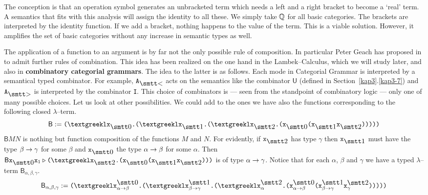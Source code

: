 The conception is that an operation symbol generates an
unbracketed term which needs a left and a right bracket
to become a `real' term. A semantics that fits with this
analysis will assign the identity to all these. We simply
take $\mathbb{Q}$ for all basic categories. The brackets are interpreted
by the identity function. If we add a bracket, nothing happens
to the value of the term. This is a viable solution. However,
it amplifies the set of basic categories without any increase in
semantic types as well.

The application of a function to an argument is by far not the
only possible rule of composition. In particular Peter Geach has
proposed in \cite{geach:program} to admit further rules of
combination. This idea has been realized on the one hand in
the Lambek--Calculus, which we will study later, and also in
\textbf{combinatory categorial grammars}.
The idea to the latter is as follows. Each mode in Categorial
Grammar is interpreted by a semantical typed combinator.
For example, $\mbox{\tt A}_{\skl}$ acts on the semantics like the
combinator $\mathsf{U}$ (defined in Section~\ref{kap3}.\ref{kap3-7}) and
$\mbox{\tt A}_{\sgr}$ is interpreted by the combinator {\tt I}.
This choice of combinators is --- seen from the standpoint of
combinatory logic --- only one of many possible choices. Let
us look at other possibilities. We could add to the ones we
have also the functions corresponding to the following closed 
$\lambda$--term.
\begin{equation}
\mathsf{B} := \mbox{\tt (\stlambda x}_{\snull}\mbox{\tt .(%
\stlambda x}_{\seins}\mbox{\tt .(\stlambda x}_{\szwei}\mbox{\tt %
.(x}_{\snull}\mbox{\tt (x}_{\seins}\mbox{\tt x}_{\szwei}\mbox{\tt )))))} 
\end{equation}
$\mathsf{B}MN$ is nothing but function composition of the functions
$M$ and $N$. For evidently, if $\mbox{\tt x}_{\szwei}$ has type $\gamma$
then $\mbox{\tt x}_{\seins}$ must have the type $\beta \rightarrow \gamma$ for 
some $\beta$ and $\mbox{\tt x}_{\snull}$ the type $\alpha \rightarrow \beta$ for 
some $\alpha$. Then $\mathsf{B}\mbox{\tt x}_{\snull}\mbox{\tt x}_1 
\triangleright \mbox{\tt (\stlambda x}_{\szwei}\mbox{\tt .(x}_{\snull}%
\mbox{\tt (x}_{\seins}\mbox{\tt x}_{\szwei}\mbox{\tt )))}$ is of type 
$\alpha \rightarrow \gamma$. Notice that for each $\alpha$, $\beta$ and
$\gamma$ we have a typed $\lambda$--term
$\mathsf{B}_{\alpha,\beta,\gamma}$.
\begin{equation}
\mathsf{B}_{\alpha,\beta,\gamma} :=
\mbox{\tt (\stlambda x}^{\snull}_{\alpha\pf\beta}\mbox{\tt .(\stlambda %
x}^{\seins}_{\beta\pf\gamma}\mbox{\tt .(\stlambda x}^{\szwei}_{\alpha}%
\mbox{\tt .(x}^{\snull}_{\alpha\pf\beta}\mbox{\tt %
(x}^{\seins}_{\beta\pf\gamma}\mbox{\tt x}^{\szwei}_{\gamma}\mbox{\tt )))))} 
\end{equation}
